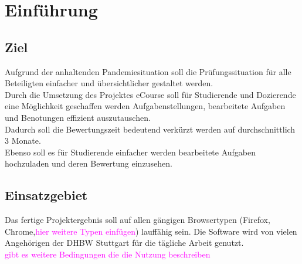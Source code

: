 
\chapter{Einführung}

\section{Ziel}
Aufgrund der anhaltenden Pandemiesituation soll die Prüfungssituation für alle Beteiligten einfacher und übersichtlicher gestaltet werden. \\
Durch die Umsetzung des Projektes eCourse soll für Studierende und Dozierende eine Möglichkeit geschaffen werden Aufgabenstellungen, bearbeitete Aufgaben und Benotungen effizient auszutauschen. \\
Dadurch soll die Bewertungszeit bedeutend verkürzt werden auf durchschnittlich 3 Monate. \\
Ebenso soll es für Studierende einfacher werden bearbeitete Aufgaben hochzuladen und deren Bewertung einzusehen. \\

\section{Einsatzgebiet}
Das fertige Projektergebnis soll auf allen gängigen Browsertypen (Firefox, Chrome,\textcolor{magenta}{hier weitere Typen einfügen}) lauffähig sein. Die Software wird von vielen Angehörigen der DHBW Stuttgart für die tägliche Arbeit genutzt. \\
\textcolor{magenta}{gibt es weitere Bedingungen die die Nutzung beschreiben}

